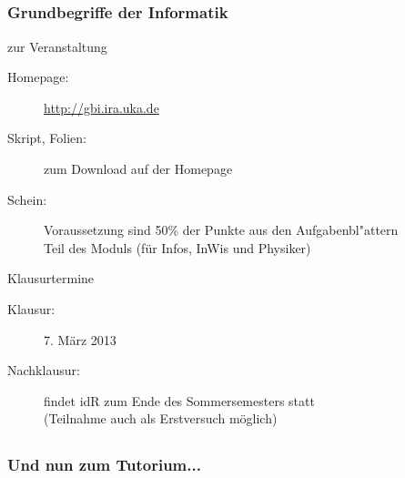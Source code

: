 \subsection*{}
\begin{frame}
        \frametitle{Grundbegriffe der Informatik}
        \begin{block}{zur Veranstaltung}
                \begin{description}
                \item[Homepage:] \url{http://gbi.ira.uka.de}
                \item[Skript, Folien:] zum Download auf der Homepage
                \item[Schein:] Voraussetzung sind 50\% der Punkte aus den Aufgabenbl"attern\\  Teil des Moduls (für Infos, InWis und Physiker)
                \end{description}
        \end{block}

        \vspace{2ex}

        \begin{block}{Klausurtermine}
                \begin{description}
                  \item[Klausur:] 7. März 2013
                  \item[Nachklausur:] findet idR zum Ende des Sommersemesters statt\\
                          (Teilnahme auch als Erstversuch möglich)
                \end{description}
        \end{block}
\end{frame}

\subsection*{}
\begin{frame}
        \frametitle{Und nun zum Tutorium...}
 \end{frame}

